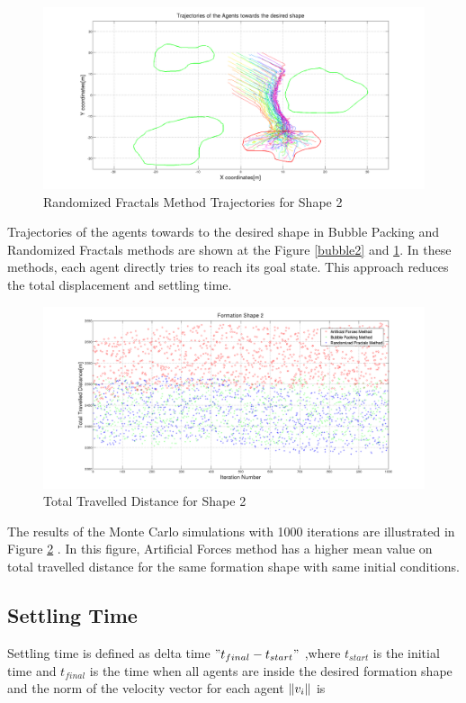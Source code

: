 \begin{figure}[H]
\caption{Randomized Fractals Method Trajectories for Shape 2} \label{randomiz2}
\centerline{\includegraphics[scale = 0.32]{Randomized_Trajectories_2}}
\end{figure} 	
		   
Trajectories of the agents towards to the desired shape in Bubble Packing and Randomized Fractals methods are shown at the Figure \ref{bubble2} and \ref{randomiz2}. In these methods, each agent directly tries to reach its goal state. This approach reduces the total displacement and settling time.
		   
\begin{figure}[H]
\caption{Total Travelled Distance for Shape 2} \label{total_dist_2}
\centerline{\includegraphics[scale = 0.28]{Total_Energy_Shape_2}} 
\end{figure} 	

The results of the Monte Carlo simulations with 1000 iterations are illustrated in Figure \ref{total_dist_2} . In this figure, Artificial Forces method has a higher mean value on total travelled distance for the same formation shape with same initial conditions.
		   
\subsection{Settling Time} \label{settling_ref}
Settling time is defined as delta time $"t_{final} - t_{start}"$ ,where $t_{start}$ is the initial time and $t_{final}$ is the time when all agents are inside the desired formation shape and the norm of the velocity vector for each agent $\left\lVert v_i\right\rVert$ is
		
